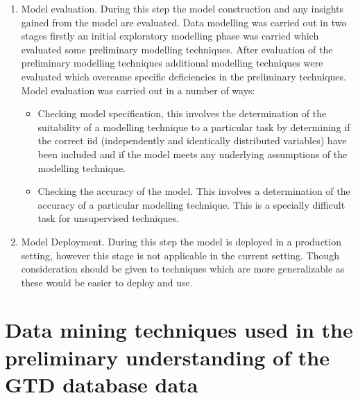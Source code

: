 \begin{enumerate}
\item Model evaluation. During this step the model construction and any insights gained from the model are evaluated. Data modelling was carried out in two stages firstly an initial exploratory modelling phase was carried which evaluated some preliminary modelling techniques. After evaluation of the preliminary modelling techniques additional modelling techniques were evaluated which overcame specific deficiencies in the preliminary techniques. Model evaluation was carried out in a number of ways:
\begin{itemize}
 \item Checking model specification, this involves the determination of the suitability of a modelling technique to a particular task by determining if the correct iid (independently and identically distributed variables) have been included and if the model meets any underlying assumptions of the modelling technique.
 \item Checking the accuracy of the model. This involves  a determination of the accuracy of a particular modelling technique. This is a specially difficult task for unsupervised techniques.
 \end{itemize} 
\item Model Deployment. During this step the model is deployed in a production setting, however this stage is not applicable in the current setting. Though consideration should be given to techniques which are more generalizable as these would be easier to deploy and use. 
\end{enumerate}

\section{Data mining techniques used in the preliminary understanding of the GTD database data}

